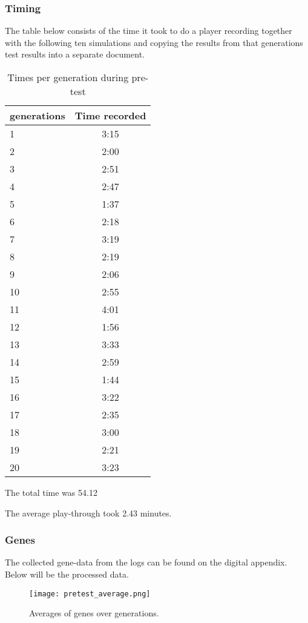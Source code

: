 \subsubsection*{Timing}
The table below consists of the time it took to do a player recording together with the following ten simulations and copying the results from that generations test results into a separate document.
\begin{table}[!htbp]
\centering
\begin{tabular}{l c}
generations & Time recorded \\
\hline
1 & 3:15 \\
2 & 2:00 \\
3 & 2:51 \\
4 & 2:47 \\
5 & 1:37 \\
6 & 2:18 \\
7 & 3:19 \\
8 & 2:19 \\
9 & 2:06 \\
10 & 2:55 \\
11 & 4:01 \\
12 & 1:56 \\
13 & 3:33 \\
14 & 2:59 \\
15 & 1:44 \\
16 & 3:22 \\
17 & 2:35 \\
18 & 3:00 \\
19 & 2:21 \\
20 & 3:23 \\
\hline
\end{tabular}
\caption{Times per generation during pre-test}\label{tab:times}
\end{table}

The total time was 54.12

The average play-through took 2.43 minutes.


\subsubsection*{Genes}
The collected gene-data from the logs can be found on the digital appendix.
Below will be the processed data.

\begin{figure}[!htbp]
	\centering
	\texttt{[image: pretest\_average.png]}
	\caption{Averages of genes over generations.}
	\label{fig:pretest_average}
\end{figure}

